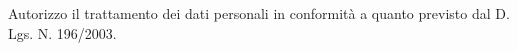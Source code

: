 \documentclass[11pt, a4paper]{awesome-cv} %
\begin{document}
\makecvheader %







%
%
%

\bigbreak

Autorizzo il trattamento dei dati personali in conformità a quanto previsto dal D. Lgs. N. 196/2003.

\end{document}
